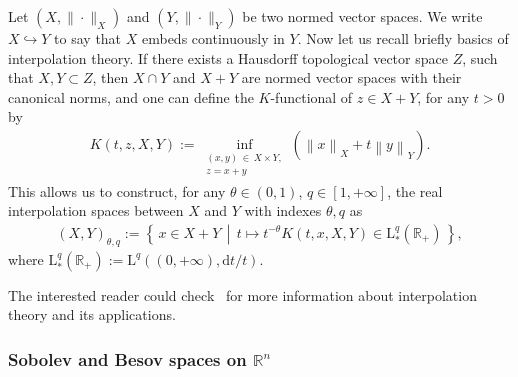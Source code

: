 \documentclass[10pt]{amsart}
\theoremstyle{definition}\newtheorem{defi}[theo]{Definition}\newtheorem{rema}[theo]{Remark}\newtheorem{exam}[theo]{Example}\newtheorem{exem}[theo]{Example}\newtheorem{nota}[theo]{Notation}
\newcommand{\bbR}{\mathbb{R}}
\newcommand{\rmd}{\mathrm{d}}
\newcommand{\rmL}{\mathrm{L}}
\begin{document}
Let $(X,\|\cdot\|_X)$ and $(Y,\|\cdot\|_Y)$ be two normed vector spaces. We write $X\hookrightarrow Y$ to say that $X$ embeds continuously in $Y$. Now let us recall briefly basics of interpolation theory. If there exists a Hausdorff topological vector space $Z$, such that $X,Y\subset Z$, then $X\cap Y$ and $X+Y$ are normed vector spaces with their canonical norms, and one can define the $K$-functional of $z\in X+Y$, for any $t>0$ by
\begin{align*}
K(t,z,X,Y):= \underset{\substack{(x,y)\,\in\,X\times Y,\\ z=x+y}}{\inf}\left({\left\|{x}\right\|_{X}+t\left\|{y}\right\|_{Y}}\right).
\end{align*}
This allows us to construct, for any $\theta\in(0,1)$, $q\in[1,+\infty]$, the real interpolation spaces between $X$ and $Y$ with indexes $\theta,q$ as
\begin{align*}
(X,Y)_{\theta,q}:= \left\{\, x\in X+Y\,\middle|\,t\longmapsto t^{-\theta}K(t,x,X,Y)\in\rmL^q_\ast(\bbR_+)\,\right\},
\end{align*}
where $\rmL^q_\ast(\bbR_+):=\rmL^q((0,+\infty),\rmd t/t)$.

The interested reader could check~\cite{BerghLofstrom1976,
bookLunardiInterpTheory,
bookTriebel1978} for more information about interpolation theory and its applications.


\subsubsection{Sobolev and Besov spaces on \texorpdfstring{$\bbR^n$}{Rn}}
\end{document}

